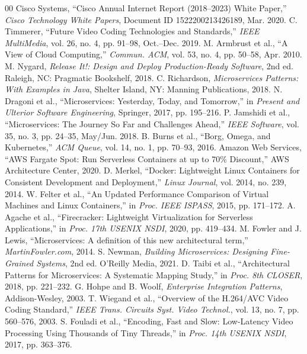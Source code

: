 \documentclass[conference]{IEEEtran}
\begin{document}
\begin{thebibliography}{00}
 Cisco Systems, ``Cisco Annual Internet Report (2018–2023) White Paper,'' \textit{Cisco Technology White Papers}, Document ID 1522200213426189, Mar. 2020.
 C. Timmerer, ``Future Video Coding Technologies and Standards,'' \textit{IEEE MultiMedia}, vol. 26, no. 4, pp. 91–98, Oct.–Dec. 2019.
 M. Armbrust et al., ``A View of Cloud Computing,'' \textit{Commun. ACM}, vol. 53, no. 4, pp. 50–58, Apr. 2010.
 M. Nygard, \textit{Release It!: Design and Deploy Production-Ready Software}, 2nd ed. Raleigh, NC: Pragmatic Bookshelf, 2018.
 C. Richardson, \textit{Microservices Patterns: With Examples in Java}, Shelter Island, NY: Manning Publications, 2018.
 N. Dragoni et al., ``Microservices: Yesterday, Today, and Tomorrow,'' in \textit{Present and Ulterior Software Engineering}, Springer, 2017, pp. 195–216.
 P. Jamshidi et al., ``Microservices: The Journey So Far and Challenges Ahead,'' \textit{IEEE Software}, vol. 35, no. 3, pp. 24–35, May/Jun. 2018.
 B. Burns et al., ``Borg, Omega, and Kubernetes,'' \textit{ACM Queue}, vol. 14, no. 1, pp. 70–93, 2016.
 Amazon Web Services, ``AWS Fargate Spot: Run Serverless Containers at up to 70\% Discount,'' AWS Architecture Center, 2020.
 D. Merkel, ``Docker: Lightweight Linux Containers for Consistent Development and Deployment,'' \textit{Linux Journal}, vol. 2014, no. 239, 2014.
 W. Felter et al., ``An Updated Performance Comparison of Virtual Machines and Linux Containers,'' in \textit{Proc. IEEE ISPASS}, 2015, pp. 171–172.
 A. Agache et al., ``Firecracker: Lightweight Virtualization for Serverless Applications,'' in \textit{Proc. 17th USENIX NSDI}, 2020, pp. 419–434.
 M. Fowler and J. Lewis, ``Microservices: A definition of this new architectural term,'' \textit{MartinFowler.com}, 2014.
 S. Newman, \textit{Building Microservices: Designing Fine-Grained Systems}, 2nd ed. O'Reilly Media, 2021.
 D. Taibi et al., ``Architectural Patterns for Microservices: A Systematic Mapping Study,'' in \textit{Proc. 8th CLOSER}, 2018, pp. 221–232.
 G. Hohpe and B. Woolf, \textit{Enterprise Integration Patterns}, Addison-Wesley, 2003.
 T. Wiegand et al., ``Overview of the H.264/AVC Video Coding Standard,'' \textit{IEEE Trans. Circuits Syst. Video Technol.}, vol. 13, no. 7, pp. 560–576, 2003.
 S. Fouladi et al., ``Encoding, Fast and Slow: Low-Latency Video Processing Using Thousands of Tiny Threads,'' in \textit{Proc. 14th USENIX NSDI}, 2017, pp. 363–376.

\end{thebibliography}
\end{document}
